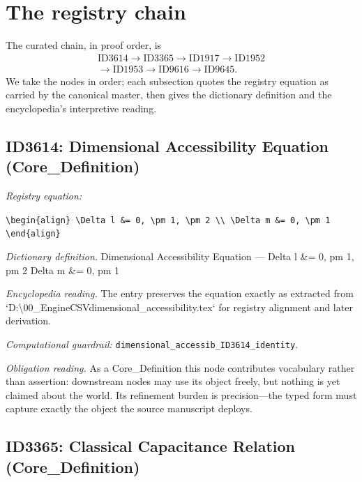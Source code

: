 \documentclass[11pt]{article}
\theoremstyle{remark}
\begin{document}
\section{The registry chain}
\label{sec:chain}

The curated chain, in proof order, is
\begin{equation*}
\begin{gathered}
\text{ID3614} \to \text{ID3365} \to \text{ID1917} \to \text{ID1952} \\
\to \text{ID1953} \to \text{ID9616} \to \text{ID9645}.
\end{gathered}
\end{equation*}
We take the nodes in order; each subsection quotes the registry equation as carried by the canonical master, then gives the dictionary definition and the encyclopedia's interpretive reading.

\subsection{ID3614: Dimensional Accessibility Equation (Core\_Definition)}

\noindent\textit{Registry equation:}\par
{\small\texttt{\textbackslash{}begin\{align\} \textbackslash{}Delta l \&= 0, \textbackslash{}pm 1, \textbackslash{}pm 2 \textbackslash{}\textbackslash{} \textbackslash{}Delta m \&= 0, \textbackslash{}pm 1 \textbackslash{}end\{align\}}}\par\medskip
\noindent\textit{Dictionary definition.} Dimensional Accessibility Equation --- Delta l \&= 0, pm 1, pm 2 Delta m \&= 0, pm 1\par\medskip
\noindent\textit{Encyclopedia reading.} The entry preserves the equation exactly as extracted from `D:\textbackslash{}00\_EngineCSVdimensional\_accessibility.tex` for registry alignment and later derivation.
\par\medskip\noindent\textit{Computational guardrail:} \texttt{dimensional\_accessib\_ID3614\_identity}.
\par\medskip\noindent\textit{Obligation reading.} As a Core\_Definition this node contributes vocabulary rather than assertion: downstream nodes may use its object freely, but nothing is yet claimed about the world. Its refinement burden is precision---the typed form must capture exactly the object the source manuscript deploys.

\subsection{ID3365: Classical Capacitance Relation (Core\_Definition)}
\end{document}
